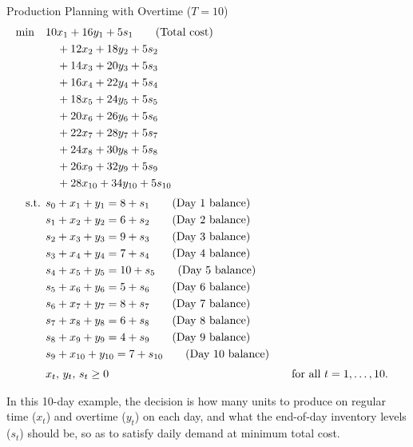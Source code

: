 \begin{examplewithallcode}{Production Planning with Overtime (\(T = 10\))}
\begin{align*}
\min \quad & 10x_1 + 16y_1 + 5s_1   \tag{Total cost} \\
             & \quad + 12x_2 + 18y_2 + 5s_2 \\
             & \quad + 14x_3 + 20y_3 + 5s_3 \\
             & \quad + 16x_4 + 22y_4 + 5s_4 \\
             & \quad + 18x_5 + 24y_5 + 5s_5 \\
             & \quad + 20x_6 + 26y_6 + 5s_6 \\
             & \quad + 22x_7 + 28y_7 + 5s_7 \\
             & \quad + 24x_8 + 30y_8 + 5s_8 \\
             & \quad + 26x_9 + 32y_9 + 5s_9 \\
             & \quad + 28x_{10} + 34y_{10} + 5s_{10} \\[1mm]
\mbox{ s.t. }        & s_0 + x_1 + y_1 = 8 + s_1   \tag{Day 1 balance} \\
             & s_1 + x_2 + y_2 = 6 + s_2   \tag{Day 2 balance} \\
             & s_2 + x_3 + y_3 = 9 + s_3   \tag{Day 3 balance} \\
             & s_3 + x_4 + y_4 = 7 + s_4   \tag{Day 4 balance} \\
             & s_4 + x_5 + y_5 = 10 + s_5   \tag{Day 5 balance} \\
             & s_5 + x_6 + y_6 = 5 + s_6   \tag{Day 6 balance} \\
             & s_6 + x_7 + y_7 = 8 + s_7   \tag{Day 7 balance} \\
             & s_7 + x_8 + y_8 = 6 + s_8   \tag{Day 8 balance} \\
             & s_8 + x_9 + y_9 = 4 + s_9   \tag{Day 9 balance} \\
             & s_9 + x_{10} + y_{10} = 7 + s_{10}   \tag{Day 10 balance} \\[1mm]
             & x_t,\, y_t,\, s_t \ge 0 &&\quad \mbox{for all } t = 1,\dots,10.
\end{align*}

In this 10-day example, the decision is how many units to produce on regular time (\(x_t\)) and overtime (\(y_t\)) on each day, and what the end-of-day inventory levels (\(s_t\)) should be, so as to satisfy daily demand at minimum total cost.

\end{examplewithallcode}

